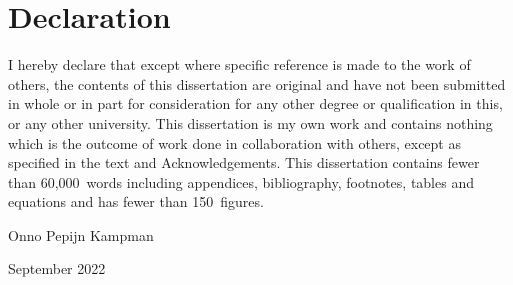\chapter*{Declaration}

I hereby declare that except where specific reference is made to the work of others, the contents of this dissertation are original and have not been submitted in whole or in part for consideration for any other degree or qualification in this, or any other university.
This dissertation is my own work and contains nothing which is the outcome of work done in collaboration with others, except as specified in the text and Acknowledgements.
This dissertation contains fewer than 60,000~words including appendices, bibliography, footnotes, tables and equations and has fewer than 150~figures.

\vspace{8mm}

\hspace*{\fill} Onno Pepijn Kampman

\hspace*{\fill} September 2022
